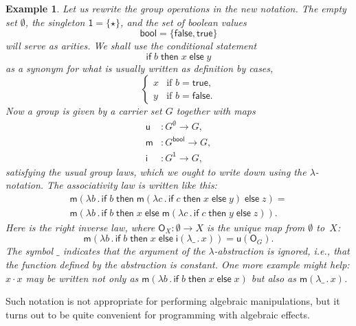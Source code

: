 \documentclass{amsart}
\newcommand{\set}[1]{\{#1\}} %
\newcommand{\lam}[1]{\lambda #1 \,.\,}
\newcommand{\one}{\mathsf{1}} %
\newcommand{\bool}{\mathsf{bool}} %
\newcommand{\true}{\mathsf{true}}
\newcommand{\false}{\mathsf{false}}
\newcommand{\cond}[3]{\mathsf{if}\;#1\;\mathsf{then}\;#2\;\mathsf{else}\;#3}
\newtheorem{example}[definition]{Example}
\begin{document}
\begin{example}
  Let us rewrite the group operations in the new notation. The empty set
  $\emptyset$, the singleton $\one = \set{\star}$, and the set of boolean values
  \begin{equation*}
    \bool = \set{\false, \true}
  \end{equation*}
  will serve as arities. We shall use the conditional statement
  \begin{equation*}
    \cond{b}{x}{y}
  \end{equation*}
  as a synonym for what is usually written as definition by cases,
  \begin{equation*}
  \begin{cases}
      x & \text{if $b = \true$,}\\
      y & \text{if $b = \false$.}
    \end{cases}
  \end{equation*}
  Now a group is given by a carrier set $G$ together with maps
  \begin{align*}
    \mathsf{u} &: G^\emptyset \to G,\\
    \mathsf{m} &: G^\bool \to G,\\
    \mathsf{i} &: G^\one \to G,
  \end{align*}
  satisfying the usual group laws, which we ought to write down using the
  $\lambda$-notation. The associativity law is written like this:
  \begin{multline*}
    \mathsf{m}(\lam{b} \cond{b}{\mathsf{m}(\lam{c}\cond{c}{x}{y})}{z}) = \\
    \mathsf{m}(\lam{b} \cond{b}{x}{\mathsf{m}(\lam{c} \cond{c}{y}{z})}).
  \end{multline*}
  Here is the right inverse law, where $\mathsf{O}_X : \emptyset \to X$ is
  the unique map from $\emptyset$ to~$X$:
  \begin{equation*}
    \mathsf{m}(\lam{b} \cond{b}{x}{\mathsf{i}(\lam{\_}{x})}) =
    \mathsf{u}(\mathsf{O}_G).
  \end{equation*}
  The symbol $\_$ indicates that the argument of the $\lambda$-abstraction is
  ignored, i.e., that the function defined by the abstraction is constant. One
  more example might help: $x \cdot x$ may be written not only as
  $\mathsf{m}(\lam{b} \cond{b}{x}{x})$ but also as $\mathsf{m}(\lam{\_} x)$.
\end{example}

Such notation is not appropriate for performing algebraic manipulations, but it
turns out to be quite convenient for programming with algebraic effects.
\end{document}
